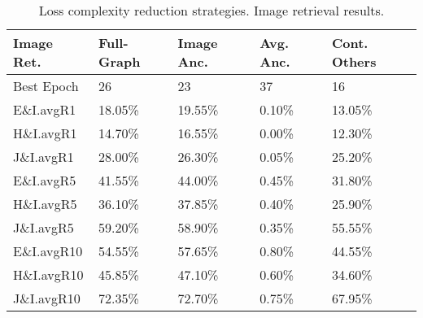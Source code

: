 \begin{table}
    \centering
\begin{tabular}{lllll}
\toprule
{Image Ret.} & Full-Graph & Image Anc. & Avg. Anc. & Cont. Others \\
\midrule
Best Epoch  &                      26 &                            23 &                   37 &                           16 \\
\midrule
E\&I.avgR1   &                  18.05\% &                       19.55\% &                0.10\% &                        13.05\% \\
H\&I.avgR1   &                  14.70\% &                       16.55\% &                0.00\% &                        12.30\% \\
J\&I.avgR1   &                  28.00\% &                       26.30\% &                0.05\% &                        25.20\% \\
\midrule
E\&I.avgR5   &                  41.55\% &                       44.00\% &                0.45\% &                        31.80\% \\
H\&I.avgR5   &                  36.10\% &                       37.85\% &                0.40\% &                        25.90\% \\
J\&I.avgR5   &                  59.20\% &                       58.90\% &                0.35\% &                        55.55\% \\
\midrule
E\&I.avgR10  &                  54.55\% &                       57.65\% &                0.80\% &                        44.55\% \\
H\&I.avgR10  &                  45.85\% &                       47.10\% &                0.60\% &                        34.60\% \\
J\&I.avgR10  &                  72.35\% &                       72.70\% &                0.75\% &                        67.95\% \\
\bottomrule

\end{tabular}
\caption{Loss complexity reduction strategies. Image retrieval results.}
\label{table:complexity_opts_img_ret}
\end{table}
